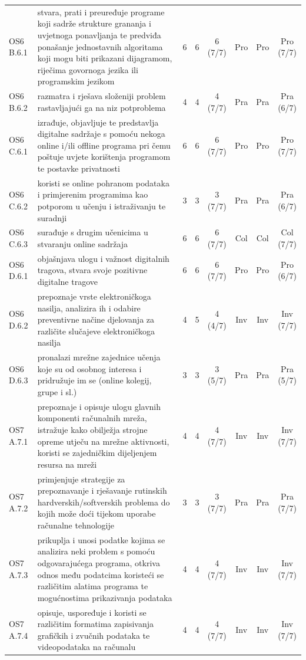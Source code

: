 \documentclass[journal,article,submit,pdftex,moreauthors]{Definitions/mdpi}
\begin{document}
{\begin{longtable}{p{1.35cm}p{6.6cm}cccccc}
OS6 B.6.1 & stvara, prati i preuređuje programe koji sadrže strukture grananja i uvjetnoga ponavljanja te predviđa ponašanje jednostavnih algoritama koji mogu biti prikazani dijagramom, riječima govornoga jezika ili programskim jezikom & 6 & 6 & 6 (7/7) & Pro & Pro & Pro (7/7) \\
OS6 B.6.2 & razmatra i rješava složeniji problem rastavljajući ga na niz potproblema & 4 & 4 & 4 (7/7) & Pra & Pra & Pra (6/7) \\
OS6 C.6.1 & izrađuje, objavljuje te predstavlja digitalne sadržaje s pomoću nekoga online i/ili offline programa pri čemu poštuje uvjete korištenja programom te postavke privatnosti & 6 & 6 & 6 (7/7) & Pro & Pro & Pro (7/7) \\
OS6 C.6.2 & koristi se online pohranom podataka i primjerenim programima kao potporom u učenju i istraživanju te suradnji & 3 & 3 & 3 (7/7) & Pra & Pra & Pra (6/7) \\
OS6 C.6.3 & surađuje s drugim učenicima u stvaranju online sadržaja & 6 & 6 & 6 (7/7) & Col & Col & Col (7/7) \\
OS6 D.6.1 & objašnjava ulogu i važnost digitalnih tragova, stvara svoje pozitivne digitalne tragove & 6 & 6 & 6 (7/7) & Pro & Pro & Pro (6/7) \\
OS6 D.6.2 & prepoznaje vrste elektroničkoga nasilja, analizira ih i odabire preventivne načine djelovanja za različite slučajeve elektroničkoga nasilja & 4 & 5 & 4 (4/7) & Inv & Inv & Inv (7/7) \\
OS6 D.6.3 & pronalazi mrežne zajednice učenja koje su od osobnog interesa i pridružuje im se (online kolegij, grupe i sl.) & 3 & 3 & 3 (5/7) & Pra & Pra & Pra (5/7) \\
OS7 A.7.1 & prepoznaje i opisuje ulogu glavnih komponenti računalnih mreža, istražuje kako obilježja strojne opreme utječu na mrežne aktivnosti, koristi se zajedničkim dijeljenjem resursa na mreži & 4 & 4 & 4 (7/7) & Inv & Inv & Inv (7/7) \\
OS7 A.7.2 & primjenjuje strategije za prepoznavanje i rješavanje rutinskih hardverskih/softverskih problema do kojih može doći tijekom uporabe računalne tehnologije & 3 & 3 & 3 (7/7) & Pra & Pra & Pra (7/7) \\
OS7 A.7.3 & prikuplja i unosi podatke kojima se analizira neki problem s pomoću odgovarajućega programa, otkriva odnos među podatcima koristeći se različitim alatima programa te mogućnostima prikazivanja podataka & 4 & 4 & 4 (7/7) & Inv & Inv & Inv (7/7) \\
OS7 A.7.4 & opisuje, uspoređuje i koristi se različitim formatima zapisivanja grafičkih i zvučnih podataka te videopodataka na računalu & 4 & 4 & 4 (7/7) & Inv & Inv & Inv (7/7) \\

\end{longtable}}
\end{document}
